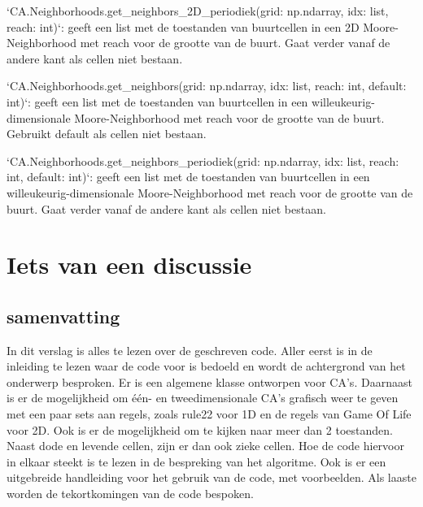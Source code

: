 \documentclass{article}
\begin{document}
\begin{markdown}
`CA.Neighborhoods.get_neighbors_2D_periodiek(grid: np.ndarray, idx: list, reach: int)`: geeft een list met de toestanden van buurtcellen in een 2D Moore-Neighborhood met reach voor de grootte van de buurt. Gaat verder vanaf de andere kant als cellen niet bestaan.

`CA.Neighborhoods.get_neighbors(grid: np.ndarray, idx: list, reach: int, default: int)`: geeft een list met de toestanden van buurtcellen in een willeukeurig-dimensionale Moore-Neighborhood met reach voor de grootte van de buurt. Gebruikt default als cellen niet bestaan.

`CA.Neighborhoods.get_neighbors_periodiek(grid: np.ndarray, idx: list, reach: int, default: int)`: geeft een list met de toestanden van buurtcellen in een willeukeurig-dimensionale Moore-Neighborhood met reach voor de grootte van de buurt. Gaat verder vanaf de andere kant als cellen niet bestaan.
\end{markdown}

\newpage
\section{Iets van een discussie}

\subsection{samenvatting} %
In dit verslag is alles te lezen over de geschreven code. Aller eerst is in de inleiding te lezen waar de code voor is bedoeld en wordt de achtergrond van het onderwerp besproken. \newline
Er is een algemene klasse ontworpen voor CA's. Daarnaast is er de mogelijkheid om één- en tweedimensionale CA's grafisch weer te geven met een paar sets aan regels, zoals rule22 voor 1D en de regels van Game Of Life voor 2D. Ook is er de mogelijkheid om te kijken naar meer dan 2 toestanden. Naast dode en levende cellen, zijn er dan ook zieke cellen.\newline 
Hoe de code hiervoor in elkaar steekt is te lezen in de bespreking van het algoritme.\newline
Ook is er een uitgebreide handleiding voor het gebruik van de code, met voorbeelden.\newline
Als laaste worden de tekortkomingen van de code bespoken.
\end{document}
